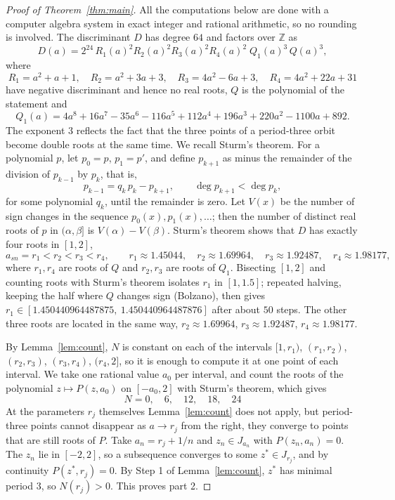 \documentclass[12pt,a4paper]{report}
\theoremstyle{definition}
\begin{document}
\begin{proof}[Proof of Theorem~\ref{thm:main}]
All the computations below are done with a computer algebra system in exact integer and rational arithmetic, so no rounding is involved. The discriminant $D$ has degree $64$ and factors over $\mathbb{Z}$ as
\[
D(a) = 2^{24}\, R_1(a)^2R_2(a)^2R_3(a)^2R_4(a)^2\; Q_1(a)^3\, Q(a)^3 ,
\]
where
\[
R_1 = a^2+a+1,\quad R_2 = a^2+3a+3,\quad R_3 = 4a^2-6a+3,\quad R_4 = 4a^2+22a+31
\]
have negative discriminant and hence no real roots, $Q$ is the polynomial of the statement and
\[
Q_1(a) = 4a^8 + 16a^7 - 35a^6 - 116a^5 + 112a^4 + 196a^3 + 220a^2 - 1100a + 892 .
\]
The exponent $3$ reflects the fact that the three points of a period-three orbit become double roots at the same time. We recall Sturm's theorem. For a polynomial $p$, let $p_0=p$, $p_1=p'$, and define $p_{k+1}$ as minus the remainder of the division of $p_{k-1}$ by $p_k$, that is,
\[
p_{k-1} = q_k\,p_k - p_{k+1}, \qquad \deg p_{k+1} < \deg p_k ,
\]
for some polynomial $q_k$, until the remainder is zero. Let $V(x)$ be the number of sign changes in the sequence $p_0(x),p_1(x),\dots$; then the number of distinct real roots of $p$ in $(\alpha,\beta]$ is $V(\alpha)-V(\beta)$. Sturm's theorem shows that $D$ has exactly four roots in $[1,2]$,
\[
a_{sn}=r_1 < r_2 < r_3 < r_4, \qquad r_1\approx1.45044,\quad r_2\approx 1.69964,\quad r_3\approx 1.92487,\quad r_4\approx 1.98177,
\]
where $r_1,r_4$ are roots of $Q$ and $r_2,r_3$ are roots of $Q_1$. Bisecting $[1,2]$ and counting roots with Sturm's theorem isolates $r_1$ in $[1,1.5]$; repeated halving, keeping the half where $Q$ changes sign (Bolzano), then gives $r_1\in[1.450440964487875,\ 1.450440964487876]$ after about $50$ steps. The other three roots are located in the same way, $r_2\approx 1.69964$, $r_3\approx 1.92487$, $r_4\approx 1.98177$.

By Lemma~\ref{lem:count}, $N$ is constant on each of the intervals $[1,r_1)$, $(r_1,r_2)$, $(r_2,r_3)$, $(r_3,r_4)$, $(r_4,2]$, so it is enough to compute it at one point of each interval. We take one rational value $a_0$ per interval, and count the roots of the polynomial $z\mapsto P(z,a_0)$ on $[-a_0,2]$ with Sturm's theorem, which gives
\[
N = 0,\quad 6,\quad 12,\quad 18,\quad 24
\]
At the parameters $r_j$ themselves Lemma~\ref{lem:count} does not apply, but period-three points cannot disappear as $a\to r_j$ from the right, they converge to points that are still roots of $P$. Take $a_n = r_j + 1/n$ and $z_n\in J_{a_n}$ with $P(z_n,a_n)=0$. The $z_n$ lie in $[-2,2]$, so a subsequence converges to some $z^*\in J_{r_j}$, and by continuity $P(z^*,r_j)=0$. By Step 1 of Lemma~\ref{lem:count}, $z^*$ has minimal period $3$, so $N(r_j)>0$. This proves part 2.


\end{proof}
\end{document}
